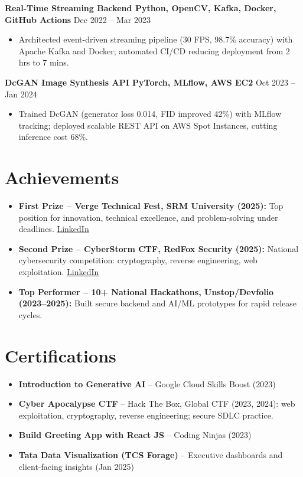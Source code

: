 \documentclass[9pt,letterpaper]{article}
\begin{document}
\textbf{Real-Time Streaming Backend \textbar{} Python, OpenCV, Kafka, Docker, GitHub Actions} \hfill Dec 2022 -- Mar 2023
\begin{itemize}
\item Architected event-driven streaming pipeline (30 FPS, 98.7\% accuracy) with Apache Kafka and Docker; automated CI/CD reducing deployment from 2 hrs to 7 mins.
\end{itemize}
\textbf{DcGAN Image Synthesis API \textbar{} PyTorch, MLflow, AWS EC2} \hfill Oct 2023 -- Jan 2024
\begin{itemize}
\item Trained DcGAN (generator loss 0.014, FID improved 42\%) with MLflow tracking; deployed scalable REST API on AWS Spot Instances, cutting inference cost 68\%.
\end{itemize}

\section{Achievements}
\begin{itemize}
\item \textbf{First Prize -- Verge Technical Fest, SRM University (2025):} Top position for innovation, technical excellence, and problem-solving under deadlines. \href{https://www.linkedin.com/posts/madhav-jadav-a8b472289_firstprize-vergetechfest-srmuniversity-activity-7307464634347790337-P4Oi}{LinkedIn}
\item \textbf{Second Prize -- CyberStorm CTF, RedFox Security (2025):} National cybersecurity competition: cryptography, reverse engineering, web exploitation. \href{https://www.linkedin.com/posts/madhav-jadav-a8b472289_cybersecurity-ctf-ethicalhacking-activity-7394407395126546434-ZjAX}{LinkedIn}
\item \textbf{Top Performer -- 10+ National Hackathons, Unstop/Devfolio (2023--2025):} Built secure backend and AI/ML prototypes for rapid release cycles.
\end{itemize}

\section{Certifications}
\begin{itemize}
\item \textbf{Introduction to Generative AI} -- Google Cloud Skills Boost (2023)
\item \textbf{Cyber Apocalypse CTF} -- Hack The Box, Global CTF (2023, 2024): web exploitation, cryptography, reverse engineering; secure SDLC practice.
\item \textbf{Build Greeting App with React JS} -- Coding Ninjas (2023)
\item \textbf{Tata Data Visualization (TCS Forage)} -- Executive dashboards and client-facing insights (Jan 2025)
\end{itemize}
\end{document}
